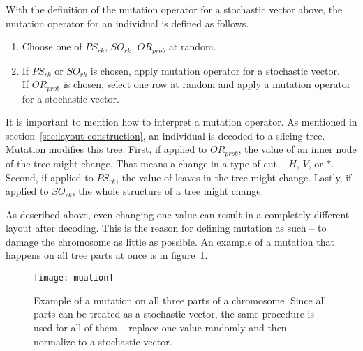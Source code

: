 With the definition of the mutation operator for a stochastic vector above, the mutation operator for an individual is defined as follows.

\begin{enumerate}
    \item Choose one of $PS_{rk}$, $SO_{rk}$, $OR_{prob}$ at random.
    \item If $PS_{rk}$ or $SO_{rk}$ is chosen, apply mutation operator for a stochastic vector.\\
    If $OR_{prob}$ is chosen, select one row at random and apply a mutation operator for a stochastic vector.
\end{enumerate}

It is important to mention how to interpret a mutation operator.
As mentioned in section~\ref{sec:layout-construction}, an individual is decoded to a slicing tree.
Mutation modifies this tree.
First, if applied to $OR_{prob}$, the value of an inner node of the tree might change.
That means a change in a type of cut – $H$, $V$, or $*$.
Second, if applied to $PS_{rk}$, the value of leaves in the tree might change.
Lastly, if applied to $SO_{rk}$, the whole structure of a tree might change.

As described above, even changing one value can result in a completely different layout after decoding.
This is the reason for defining mutation as such – to damage the chromosome as little as possible.
An example of a mutation that happens on all tree parts at once is in figure~\ref{fig:mutation}.


\begin{figure}[htp]
    \texttt{[image: muation]}\caption{
        Example of a mutation on all three parts of a chromosome.
        Since all parts can be treated as a stochastic vector, the same procedure
        is used for all of them – replace one value randomly and then normalize to a stochastic vector.
    }
    \label{fig:mutation}
\end{figure}

